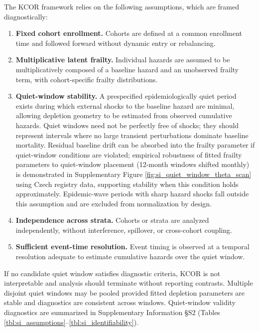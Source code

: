 \documentclass[
]{article}
\begin{document}
The KCOR framework relies on the following assumptions, which are framed
diagnostically:

\begin{enumerate}
\def\labelenumi{\arabic{enumi}.}
\item
  \textbf{Fixed cohort enrollment.} Cohorts are defined at a common
  enrollment time and followed forward without dynamic entry or
  rebalancing.
\item
  \textbf{Multiplicative latent frailty.} Individual hazards are assumed
  to be multiplicatively composed of a baseline hazard and an unobserved
  frailty term, with cohort-specific frailty distributions.
\item
  \textbf{Quiet-window stability.} A prespecified epidemiologically
  quiet period exists during which external shocks to the baseline
  hazard are minimal, allowing depletion geometry to be estimated from
  observed cumulative hazards. Quiet windows need not be perfectly free
  of shocks; they should represent intervals where no large transient
  perturbations dominate baseline mortality. Residual baseline drift can
  be absorbed into the frailty parameter if quiet-window conditions are
  violated; empirical robustness of fitted frailty parameters to
  quiet-window placement (12-month windows shifted monthly) is
  demonstrated in Supplementary Figure
  \ref{fig:si_quiet_window_theta_scan} using Czech registry data,
  supporting stability when this condition holds approximately.
  Epidemic-wave periods with sharp hazard shocks fall outside this
  assumption and are excluded from normalization by design.
\item
  \textbf{Independence across strata.} Cohorts or strata are analyzed
  independently, without interference, spillover, or cross-cohort
  coupling.
\item
  \textbf{Sufficient event-time resolution.} Event timing is observed at
  a temporal resolution adequate to estimate cumulative hazards over the
  quiet window.
\end{enumerate}

If no candidate quiet window satisfies diagnostic criteria, KCOR is not
interpretable and analysis should terminate without reporting contrasts.
Multiple disjoint quiet windows may be pooled provided fitted depletion
parameters are stable and diagnostics are consistent across windows.
Quiet-window validity diagnostics are summarized in Supplementary
Information §S2 (Tables
\ref{tbl:si_assumptions}--\ref{tbl:si_identifiability}).
\end{document}
